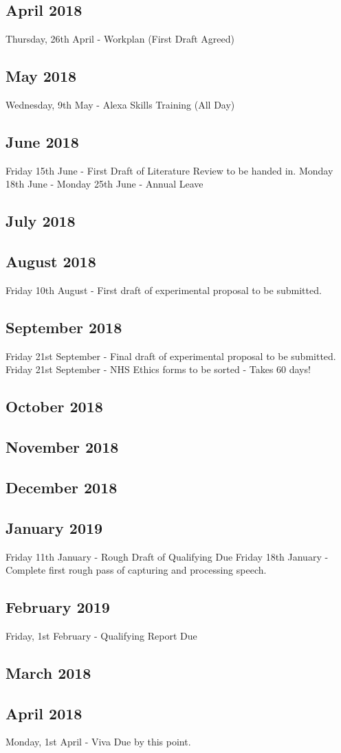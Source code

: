 \documentclass{article}
\begin{document}
	\subsection{April 2018}
	Thursday, 26th April - Workplan (First Draft Agreed)
	\subsection{May 2018}
	Wednesday, 9th May - Alexa Skills Training (All Day)
	\subsection{June 2018}
	Friday 15th June - First Draft of Literature Review to be handed in.
	\newline
	Monday 18th June - Monday 25th June - Annual Leave
	\subsection{July 2018}
	
	\subsection{August 2018}
	Friday 10th August - First draft of experimental proposal to be submitted.
	
	
	\subsection{September 2018}
	Friday 21st September - Final draft of experimental proposal to be submitted. 
	Friday 21st September - NHS Ethics forms to be sorted  - Takes 60 days!
	\subsection{October 2018}

	\subsection{November 2018}
	
	\subsection{December 2018}	
	
	\subsection{January 2019}
	Friday 11th January - Rough Draft of Qualifying Due
	Friday 18th January - Complete first rough pass of capturing and processing speech.
	
	\subsection{February 2019}
	Friday, 1st February - Qualifying Report Due
	
	\subsection{March 2018}
	
	\subsection{April 2018}
	Monday, 1st April - Viva Due by this point.
\end{document}
